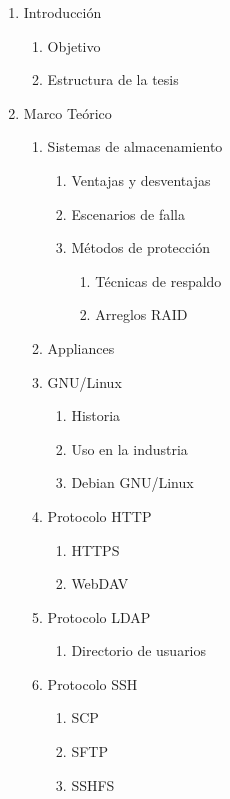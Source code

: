 {\begin{enumerate}
  \item Introducci\'{o}n
  \begin{enumerate}
    \item Objetivo
    \item Estructura de la tesis
  \end{enumerate}
  \item Marco Te\'{o}rico
  \begin{enumerate}
    \item Sistemas de almacenamiento
    \begin{enumerate}
      \item Ventajas y desventajas
      \item Escenarios de falla
      \item M\'{e}todos de protecci\'{o}n
      \begin{enumerate}
        \item T\'{e}cnicas de respaldo
        \item Arreglos RAID
      \end{enumerate}
    \end{enumerate}
    \item Appliances
    \item GNU/Linux
    \begin{enumerate}
      \item Historia
      \item Uso en la industria
      \item Debian GNU/Linux
    \end{enumerate}
    \item Protocolo HTTP
    \begin{enumerate}
      \item HTTPS
      \item WebDAV
    \end{enumerate}
    \item Protocolo LDAP
    \begin{enumerate}
      \item Directorio de usuarios
    \end{enumerate}
    \item Protocolo SSH
    \begin{enumerate}
      \item SCP
      \item SFTP
      \item SSHFS
    \end{enumerate}
  \end{enumerate}

\end{enumerate}}
